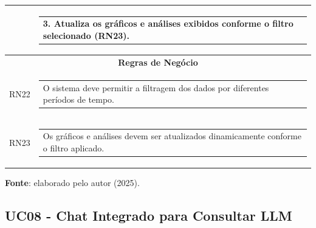\begin{longtable}[c]{|p{}|p{}|}
\multicolumn{1}{|p{0.48\textwidth}|}{} &
  \begin{tabular}[c]{@{}p{}@{}}3. Atualiza os gráficos e análises exibidos conforme o filtro selecionado (RN23).\end{tabular} \\ \hline
\multicolumn{2}{|c|}{\textbf{Regras de Negócio}} \\ \hline
\multicolumn{1}{|p{0.48\textwidth}|}{RN22} &
  \begin{tabular}[c]{@{}p{}@{}}O sistema deve permitir a filtragem dos dados por diferentes períodos de tempo.\end{tabular} \\ \hline
\multicolumn{1}{|p{0.48\textwidth}|}{RN23} &
  \begin{tabular}[c]{@{}p{}@{}}Os gráficos e análises devem ser atualizados dinamicamente conforme o filtro aplicado.\end{tabular} \\ \hline
\end{longtable}
\begin{center}
    \small{\textbf{Fonte}: elaborado pelo autor (2025).}
\end{center}


\subsection{UC08 - Chat Integrado para Consultar LLM}

